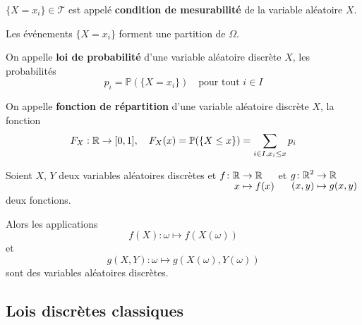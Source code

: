 \documentclass[a4paper,12pt]{article}
\begin{document}
\begin{remarque}
    $\{ X = x_i \} \in \mathcal{T}$ est appelé \textbf{condition de mesurabilité} de la variable aléatoire $X$.
\end{remarque}

\begin{proposition}{}{}
    Les événements $\{ X = x_i \}$ forment une partition de $\Omega$.
\end{proposition}

\begin{demonstration}
\end{demonstration}

\begin{definition}
    On appelle \textbf{loi de probabilité} d'une variable aléatoire discrète $X$, les probabilités
    $$
    p_i = \mathbb{P}(\{ X = x_i \}) \quad \text{pour tout } i \in I
    $$
\end{definition}

\begin{definition}
    On appelle \textbf{fonction de répartition} d'une variable aléatoire discrète $X$, la fonction
    $$
    F_X : \mathbb{R} \to [0, 1], \quad F_X(x) = \mathbb{P}(\{ X \leq x \}) = \sum_{i \in I, x_i \leq x} p_i
    $$
\end{definition}

\begin{theoreme}{}{}
    Soient $X$, $Y$ deux variables aléatoires discrètes et $\funcdef{f}{\R}{\R}{x}{f(x)}$ et $\funcdef{g}{\R^2}{\R}{(x, y)}{g(x, y)}$ deux fonctions.

    Alors les applications
    $$
    f(X): \omega \mapsto f(X(\omega))
    $$
    et
    $$
    g(X, Y): \omega \mapsto g(X(\omega), Y(\omega))
    $$
    sont des variables aléatoires discrètes.
\end{theoreme}

\begin{demonstration}
\end{demonstration}

\subsection{Lois discrètes classiques}
\end{document}

